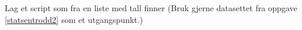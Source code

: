 



Lag et script som fra en liste med tall finner
(Bruk gjerne datasettet fra oppgave \ref{statsentrodd2} som et utgangspunkt.)



